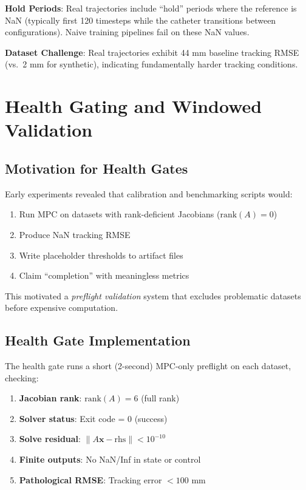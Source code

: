 \documentclass[conference]{IEEEtran}
\begin{document}
\textbf{Hold Periods}: Real trajectories include ``hold'' periods where the reference is NaN (typically first 120 timesteps while the catheter transitions between configurations). Naive training pipelines fail on these NaN values.

\textbf{Dataset Challenge}: Real trajectories exhibit 44 mm baseline tracking RMSE (vs.~2 mm for synthetic), indicating fundamentally harder tracking conditions.

\section{Health Gating and Windowed Validation}

\subsection{Motivation for Health Gates}

Early experiments revealed that calibration and benchmarking scripts would:
\begin{enumerate}
\item Run MPC on datasets with rank-deficient Jacobians ($\text{rank}(A) = 0$)
\item Produce NaN tracking RMSE
\item Write placeholder thresholds to artifact files
\item Claim ``completion'' with meaningless metrics
\end{enumerate}

This motivated a \emph{preflight validation} system that excludes problematic datasets before expensive computation.

\subsection{Health Gate Implementation}

The health gate runs a short (2-second) MPC-only preflight on each dataset, checking:

\begin{enumerate}
\item \textbf{Jacobian rank}: $\text{rank}(A) = 6$ (full rank)
\item \textbf{Solver status}: Exit code = 0 (success)
\item \textbf{Solve residual}: $\|A \mathbf{x} - \text{rhs}\| < 10^{-10}$
\item \textbf{Finite outputs}: No NaN/Inf in state or control
\item \textbf{Pathological RMSE}: Tracking error $< 100$ mm
\end{enumerate}
\end{document}
